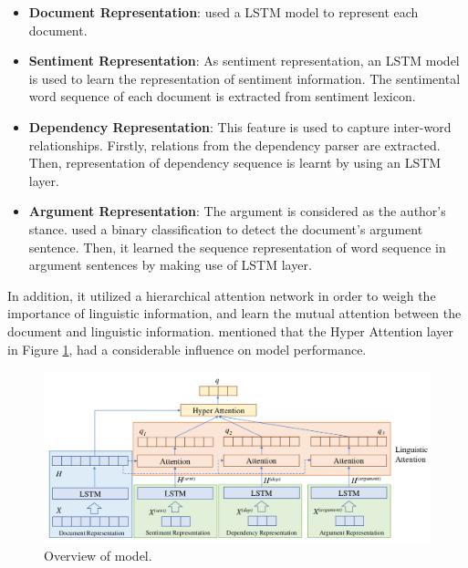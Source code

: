 	\begin{itemize}
		\item \textbf{Document Representation}: \cite{Hierarchical-Attention-Network} used a LSTM model to represent each document.
		\item \textbf{Sentiment Representation}: As sentiment representation, an LSTM model is used to learn the representation of sentiment information. The sentimental word sequence of each document is extracted from sentiment lexicon. 
		\item \textbf{Dependency Representation}: This feature is used to capture inter-word relationships. Firstly, relations from the dependency parser are extracted. Then, representation of dependency sequence is learnt by using an LSTM layer.
		\item \textbf{Argument Representation}: The argument is considered as the author's stance. \cite{Hierarchical-Attention-Network} used a binary classification to detect the document's argument sentence. Then, it learned the sequence representation of word sequence in argument sentences by making use of LSTM layer.
	\end{itemize}
	
	In addition, it utilized a hierarchical attention network in order to weigh the importance of linguistic information, and learn the mutual attention between the document and linguistic information. \cite{Hierarchical-Attention-Network} mentioned that the Hyper Attention layer in Figure \ref{fig:hierarchical_att}, had a considerable influence on model performance. 
	
	\begin{figure}
		\centering
		\includegraphics[scale=0.4]{statistics/stance/hierarchial-attention-network.png}
		\caption{Overview of \cite{Hierarchical-Attention-Network} model.}
		\label{fig:hierarchical_att}
	\end{figure}
	
